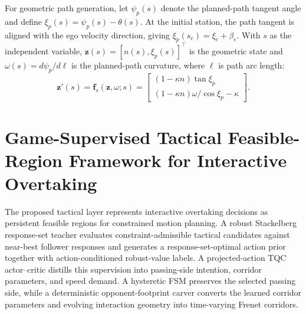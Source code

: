 \documentclass[journal,twoside,web]{ieeecolor}
\begin{document}
For geometric path generation, let $\psi_p(s)$ denote the planned-path tangent
angle and define $\xi_p(s)=\psi_p(s)-\theta(s)$. At the initial station, the
path tangent is aligned with the ego velocity direction, giving
$\xi_p(s_e)=\xi_e+\beta_e$. With $s$ as the independent variable,
$\bm z(s)=[n(s),\xi_p(s)]^\top$ is the geometric state and
$\omega(s)=d\psi_p/d\ell$ is the planned-path curvature, where $\ell$ is path
arc length:
\begin{equation}
\bm z'(s)=\bm f_s(\bm z,\omega;s)=
\begin{bmatrix}
(1-\kappa n)\tan\xi_p\\[2pt]
(1-\kappa n)\omega/\cos\xi_p-\kappa
\end{bmatrix}.
\label{eq:spatial_model}
\end{equation}


\section{Game-Supervised Tactical Feasible-Region Framework for Interactive Overtaking}\label{sec:tactical}

The proposed tactical layer represents interactive overtaking decisions as
persistent feasible regions for constrained motion planning. A robust
Stackelberg response-set teacher evaluates constraint-admissible tactical
candidates against near-best follower responses and generates a
response-set-optimal action prior together with action-conditioned
robust-value labels. A projected-action TQC actor--critic distills this
supervision into passing-side intention, corridor parameters, and speed
demand. A hysteretic FSM preserves the selected passing side, while
a deterministic opponent-footprint carver converts the learned corridor
parameters and evolving interaction geometry into time-varying Frenet
corridors.
\end{document}
